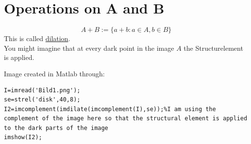 \section{Operations on A and B}
\[A+B := \{a + b : a \in A, b \in B\}\]
This is called \underline{dilation}.\\
You might imagine that at every dark point in the image $A$ the Structurelement is applied.
\begin{center}
\end{center}

Image created in Matlab through:
\begin{lstlisting}
I=imread('Bild1.png');
se=strel('disk',40,8);
I2=imcomplement(imdilate(imcomplement(I),se));%I am using the complement of the image here so that the structural element is applied to the dark parts of the image
imshow(I2);
\end{lstlisting}

